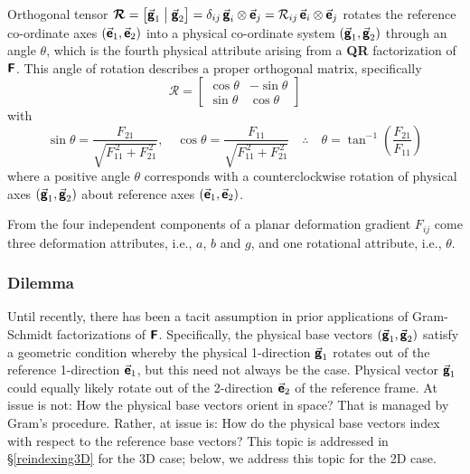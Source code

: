 Orthogonal tensor $\boldsymbol{\mathcal{R}} = \bigl[ \vec{\boldsymbol{\mathsf{g}}}_1 \bigm| \vec{\boldsymbol{\mathsf{g}}}_2 \bigr] = \delta_{ij} \, \vec{\boldsymbol{\mathsf{g}}}_i \otimes \vec{\boldsymbol{\mathsf{e}}}_j = \mathcal{R}_{ij} \, \vec{\boldsymbol{\mathsf{e}}}_i \otimes \vec{\boldsymbol{\mathsf{e}}}_j$ rotates the reference co-ordinate axes $( \vec{\boldsymbol{\mathsf{e}}}_1 , \vec{\boldsymbol{\mathsf{e}}}_2 )$ into a physical co-ordinate system $( \vec{\boldsymbol{\mathsf{g}}}_1 , \vec{\boldsymbol{\mathsf{g}}}_2 )$ through an angle $\theta$, which is the fourth physical attribute arising from a \textbf{QR} factorization of $\boldsymbol{\mathsf{F}}$.  This angle of rotation describes a proper orthogonal matrix, specifically
\begin{equation}
\boldsymbol{\mathcal{R}} = \begin{bmatrix}
\cos \theta & -\sin \theta \\
\sin \theta & \cos \theta
\end{bmatrix} 
\label{rotation}
\end{equation}  
with
\begin{equation}
\sin \theta = \frac{F_{21}}
{\sqrt{F_{11}^{\,2} + F_{21}^{\,2}}} , \quad
\cos \theta = \frac{F_{11}}
{\sqrt{F_{11}^{\,2} + F_{21}^{\,2}}} 
\quad \therefore \quad
\theta = \tan^{-1} \left( \frac{F_{21}}{F_{11}} \right)
\label{trigFns}
\end{equation}  
where a positive angle $\theta$ corresponds with a counter\-clockwise rotation of physical axes $( \vec{\boldsymbol{\mathsf{g}}}_1 , \vec{\boldsymbol{\mathsf{g}}}_2 )$ about reference axes $( \vec{\boldsymbol{\mathsf{e}}}_1 , \vec{\boldsymbol{\mathsf{e}}}_2 )$.  

From the four independent components of a planar deformation gradient $F_{ij}$ come three deformation attributes, i.e., $a$, $b$ and $g$, and one rotational attribute, i.e., $\theta$.


\subsubsection{Dilemma}
\label{secDilemma} 

Until recently, \cite{Pauletal20} there has been a tacit assumption in prior applications of Gram-Schmidt factorizations of $\boldsymbol{\mathsf{F}}$. Specifically, the physical base vectors $( \vec{\boldsymbol{\mathsf{g}}}_1 , \vec{\boldsymbol{\mathsf{g}}}_2 )$ satisfy a geometric condition whereby the physical 1-direction $\vec{\boldsymbol{\mathsf{g}}}_1$ rotates out of the reference 1-direction $\vec{\boldsymbol{\mathsf{e}}}_1$, but this need not always be the case.  Physical vector $\vec{\boldsymbol{\mathsf{g}}}_1$ could equally likely rotate out of the 2-direction $\vec{\boldsymbol{\mathsf{e}}}_2$ of the reference frame.  At issue is not: How the physical base vectors orient in space?  That is managed by Gram's procedure.  Rather, at issue is: How do the physical base vectors index with respect to the reference base vectors?  This topic is addressed in \S\ref{reindexing3D} for the 3D case; below, we address this topic for the 2D case.

